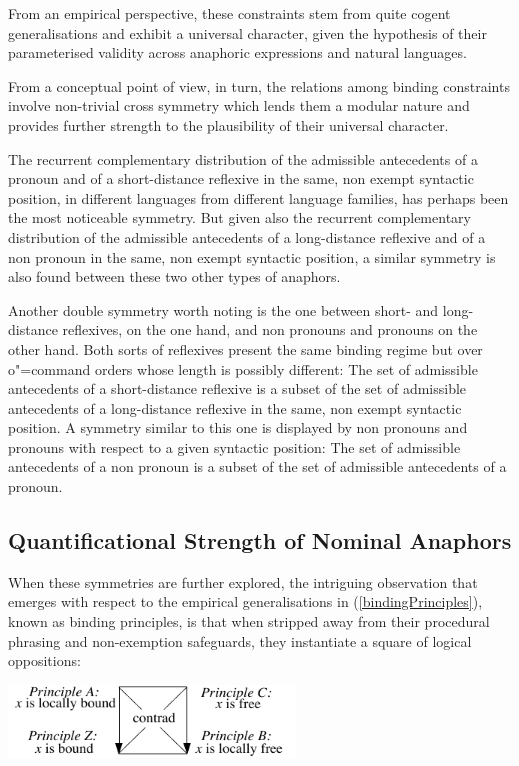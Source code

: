 \documentclass[output=paper
,modfonts
,nonflat]{langsci/langscibook}
\begin{document}
From an empirical perspective, these constraints stem from quite cogent generalisations and exhibit a universal
character, given the hypothesis of their parameterised validity across anaphoric expressions and natural languages.

From a conceptual point of view, in turn, the relations among binding
constraints involve non-trivial cross symmetry which lends them a modular nature
and provides further strength to the plausibility of their universal character.


The recurrent complementary distribution of the admissible antecedents
of a pronoun and of a short-distance reflexive in the same, non exempt
syntactic position, in different languages from different language families,
has perhaps been the most noticeable symmetry. But given also the recurrent complementary 
distribution of the admissible antecedents of a long-distance
reflexive and of a non pronoun in the same, non exempt syntactic position,
a similar symmetry is also found between these two other types of anaphors.

Another double symmetry worth noting is the one
between short- and long-distance reflexives, on the one hand,
and non pronouns and pronouns on the other hand. Both sorts
of reflexives present the same binding regime but over
o"=command orders whose length is possibly different: The set
of admissible antecedents of a short-distance reflexive is a subset
of the set of admissible antecedents of a long-distance reflexive
in the same, non exempt syntactic position. A symmetry similar to
this one is displayed by non pronouns and pronouns with respect
to a given syntactic position: The set of admissible antecedents of
a non pronoun is a subset of the set of admissible antecedents of
a pronoun.

\subsection{Quantificational Strength of Nominal Anaphors \label{quantAnaphor}}

When these symmetries are further explored, 
the intriguing observation that emerges 
with respect to the empirical generalisations in
(\ref{bindingPrinciples}), known as binding principles, is that when stripped away from
their procedural phrasing and non-exemption safeguards,
they instantiate a square of logical oppositions:

\begin{exe}
\ex
\label{bindingSquareOpposition}
\end{exe}
\vspace{-7mm}
 \centerline{\includegraphics[width=18pc]{figures/bindingSquareOpposition.pdf}}
\end{document}
